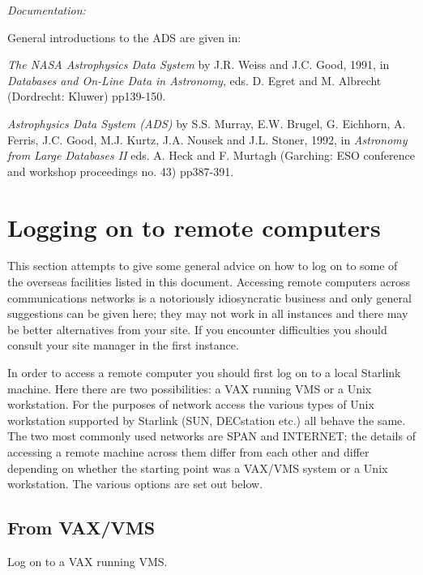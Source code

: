 \documentclass[twoside,11pt]{article}
\newcommand{\xlabel}[1]{}
\begin{document}
{\it Documentation:}

General introductions to the ADS are given in:

 {\it The NASA Astrophysics Data System} by J.R. Weiss and J.C. Good, 
1991, in {\it Databases and On-Line Data in Astronomy}, eds. D. Egret 
and M. Albrecht (Dordrecht: Kluwer) pp139-150.

{\it Astrophysics Data System (ADS)} by S.S. Murray, E.W. Brugel, G. 
Eichhorn, A. Ferris, J.C. Good, M.J. Kurtz, J.A. Nousek and J.L. Stoner,
1992, in {\it Astronomy from Large Databases II} eds. A. Heck and F. 
Murtagh (Garching: ESO conference and workshop proceedings no. 43) 
pp387-391.

\section{Logging on to remote computers
\xlabel{logging_on_to_remote_computers}\label{REMOTE}}

This section attempts to give some general advice on how to log on to
some of the overseas facilities listed in this document. Accessing 
remote computers across communications networks is a notoriously 
idiosyncratic business and only general suggestions can be given here; 
they may not work in all instances and there may be better alternatives 
from your site. If you encounter difficulties you should consult your 
site manager in the first instance.

In order to access a remote computer you should first log on to a local
Starlink machine. Here there are two possibilities: a VAX running VMS
or a Unix workstation. For the purposes of network access the various
types of Unix workstation supported by Starlink (SUN, DECstation etc.)
all behave the same. The two most commonly used networks are SPAN and
INTERNET; the details of accessing a remote machine across them differ
from each other and differ depending on whether the starting point was
a VAX/VMS system or a Unix workstation. The various options are set out
below.

\subsection{From VAX/VMS\xlabel{from_vaxvms}}

Log on to a VAX running VMS.
\end{document}
